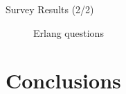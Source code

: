 \begin{frame}{Survey Results (2/2)}
  \begin{figure}
    \centering
    \caption{Erlang questions}
  \end{figure}
\end{frame}

\section{Conclusions}

